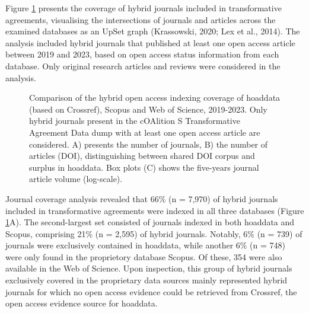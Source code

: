 \documentclass[a4paper,man,floatsintext,longtable,noextraspace,10pt]{apa6}
\begin{document}
Figure \ref{fig-upset_coverage_results} presents the coverage of hybrid
journals included in transformative agreements, visualising the
intersections of journals and articles across the examined databases as
an UpSet graph (Krassowski, 2020; Lex et al., 2014). The analysis
included hybrid journals that published at least one open access article
between 2019 and 2023, based on open access status information from each
database. Only original research articles and reviews were considered in
the analysis.

\begin{figure}[ht!]


\caption{\label{fig-upset_coverage_results}Comparison of the hybrid open
access indexing coverage of hoaddata (based on Crossref), Scopus and Web
of Science, 2019-2023. Only hybrid journals present in the cOAlition S
Transformative Agreement Data dump with at least one open access article
are considered. A) presents the number of journals, B) the number of
articles (DOI), distinguishing between shared DOI corpus and surplus in
hoaddata. Box plots (C) shows the five-years journal article volume
(log-scale).}

\end{figure}%

Journal coverage analysis revealed that 66\% (n = 7,970) of hybrid
journals included in transformative agreements were indexed in all three
databases (Figure \ref{fig-upset_coverage_results}A). The second-largest
set consisted of journals indexed in both hoaddata and Scopus,
comprising 21\% (n = 2,595) of hybrid journals. Notably, 6\% (n = 739)
of journals were exclusively contained in hoaddata, while another 6\% (n
= 748) were only found in the proprietory database Scopus. Of these, 354
were also available in the Web of Science. Upon inspection, this group
of hybrid journals exclusively covered in the proprietary data sources
mainly represented hybrid journals for which no open access evidence
could be retrieved from Crossref, the open access evidence source for
hoaddata.
\end{document}
